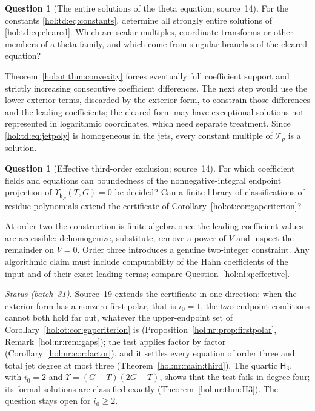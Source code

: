 \documentclass[11pt]{article}
\numberwithin{equation}{section}
\theoremstyle{definition}
\newtheorem{question}[theorem]{Question}
\theoremstyle{remark}
\begin{document}
\begin{question}[The entire solutions of the theta equation; source~14]
\label{hol:ot:q:thetasolutions}
For the constants \eqref{hol:td:eq:constants}, determine all strongly entire
solutions of \eqref{hol:td:eq:cleared}. Which are scalar multiples,
coordinate transforms or other members of a theta family, and which come from singular
branches of the cleared equation?
\end{question}

Theorem~\ref{hol:ot:thm:convexity} forces eventually full coefficient support
and strictly increasing consecutive coefficient differences. The next step
would use the lower exterior terms, discarded by the exterior form, to
constrain those differences and the leading coefficients; the cleared form may
have exceptional solutions not represented in logarithmic coordinates, which
need separate treatment. Since \eqref{hol:td:eq:jetpoly} is homogeneous in
the jets, every constant multiple of $\mathcal T_p$ is a solution.

\begin{question}[Effective third-order exclusion; source~14]
\label{hol:ot:q:effective}
For which coefficient fields and equations can boundedness of the
nonnegative-integral endpoint projection of $\Upsilon_{\mathfrak h_P}(T,G)=0$
be decided? Can a finite library of classifications of residue polynomials
extend the certificate of Corollary~\ref{hol:ot:cor:gapcriterion}?
\end{question}

At order two the construction is finite algebra once the leading coefficient
values are accessible: dehomogenize, substitute, remove a power of $V$ and
inspect the remainder on $V=0$. Order three introduces a genuine two-integer
constraint. Any algorithmic claim must include computability of the Hahn
coefficients of the input and of their exact leading terms; compare
Question~\ref{hol:nl:q:effective}.

\emph{Status (batch~31).} Source~19 extends the certificate in one direction:
when the exterior form has a nonzero first polar, that is $i_0=1$, the two
endpoint conditions cannot both hold far out, whatever the upper-endpoint set
of Corollary~\ref{hol:ot:cor:gapcriterion} is
(Proposition~\ref{hol:nr:prop:firstpolar}, Remark~\ref{hol:nr:rem:gaps}); the
test applies factor by factor (Corollary~\ref{hol:nr:cor:factor}), and it
settles every equation of order three and total jet degree at most three
(Theorem~\ref{hol:nr:main:third}). The quartic $\mathsf H_3$, with $i_0=2$ and
$\Upsilon=(G+T)(2G-T)$, shows that the test fails in degree four; its formal
solutions are classified exactly (Theorem~\ref{hol:nr:thm:H3}). The question
stays open for $i_0\ge2$.
\end{document}
